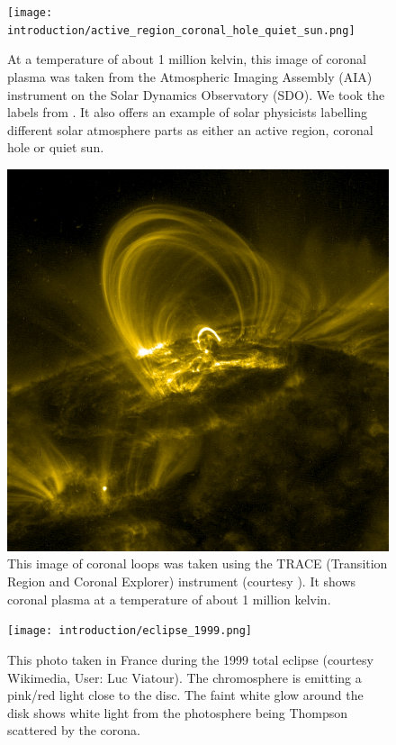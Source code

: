 \begin{figure}[!htp]
    \centering
    \texttt{[image: introduction/active\_region\_coronal\_hole\_quiet\_sun.png]}
    \caption{At a temperature of about 1 million kelvin, this image of coronal plasma was taken from the Atmospheric Imaging Assembly (AIA) instrument on the Solar Dynamics Observatory (SDO). We took the labels from \citet{Cargill2011}. It also offers an example of solar physicists labelling different solar atmosphere parts as either an active region, coronal hole or quiet sun.}
    \label{fig:active_region_quiet_sun_coronal_hole}
\end{figure}

\begin{figure}[!htp]
    \centering
    \includegraphics[width=\textwidth]{figures/introduction/coronal_loop_trace.jpg}
    \caption{This image of coronal loops was taken using the TRACE (Transition Region and Coronal Explorer) instrument (courtesy \citet{images_of_coronal_loops}). It shows coronal plasma at a temperature of about 1 million kelvin.}
    \label{fig:coronal_loops_trace}
\end{figure}


\begin{figure}[!htp]
    \centering
    \texttt{[image: introduction/eclipse\_1999.png]}
    \caption{This photo taken in France during the 1999 total eclipse (courtesy Wikimedia, User: Luc Viatour). The chromosphere is emitting a pink/red light close to the disc. The faint white glow around the disk shows white light from the photosphere being Thompson scattered by the corona.}
    \label{fig:total_eclipse1999}
\end{figure}

